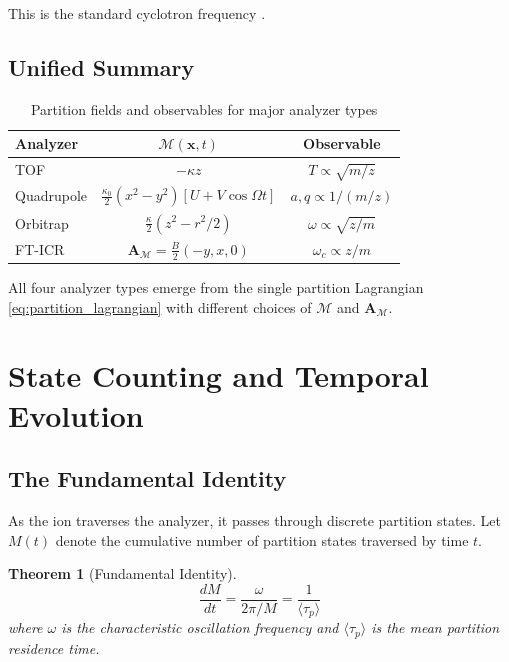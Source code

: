 \documentclass[twocolumn,10pt,a4paper]{article}
\newtheorem{theorem}{Theorem}[section]
\theoremstyle{definition}
\theoremstyle{remark}
\newcommand{\Mdepth}{\mathcal{M}}
\newcommand{\Apartition}{\mathbf{A}_{\mathcal{M}}}
\newcommand{\taup}{\tau_p}
\begin{document}
This is the standard cyclotron frequency \citep{marshall1998}.

\subsection{Unified Summary}

\begin{table}[h]
\centering
\caption{Partition fields and observables for major analyzer types}
\label{tab:analyzers}
\begin{tabular}{lcc}
\toprule
\textbf{Analyzer} & \textbf{$\Mdepth(\mathbf{x}, t)$} & \textbf{Observable} \\
\midrule
TOF & $-\kappa z$ & $T \propto \sqrt{m/z}$ \\
Quadrupole & $\frac{\kappa_0}{2}(x^2-y^2)[U+V\cos\Omega t]$ & $a, q \propto 1/(m/z)$ \\
Orbitrap & $\frac{\kappa}{2}(z^2 - r^2/2)$ & $\omega \propto \sqrt{z/m}$ \\
FT-ICR & $\Apartition = \frac{B}{2}(-y, x, 0)$ & $\omega_c \propto z/m$ \\
\bottomrule
\end{tabular}
\end{table}

All four analyzer types emerge from the single partition Lagrangian \eqref{eq:partition_lagrangian} with different choices of $\Mdepth$ and $\Apartition$.

\section{State Counting and Temporal Evolution}
\label{sec:counting}

\subsection{The Fundamental Identity}

As the ion traverses the analyzer, it passes through discrete partition states. Let $M(t)$ denote the cumulative number of partition states traversed by time $t$.

\begin{theorem}[Fundamental Identity]
\label{thm:fundamental}
\begin{equation}
    \boxed{\frac{dM}{dt} = \frac{\omega}{2\pi/M} = \frac{1}{\langle\taup\rangle}}
    \label{eq:fundamental_identity}
\end{equation}
where $\omega$ is the characteristic oscillation frequency and $\langle\taup\rangle$ is the mean partition residence time.
\end{theorem}
\end{document}
